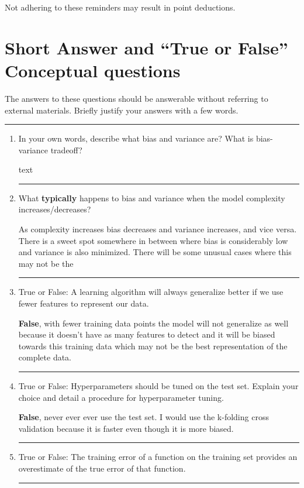 \documentclass{article}
\begin{document}
Not adhering to these reminders may result in point deductions. \\

\clearpage{}



\section*{Short Answer and ``True or False'' Conceptual questions}
\begin{aprob}
    The answers to these questions should be answerable without referring to external materials.  Briefly justify your answers with a few words.
    
    \rule{\textwidth}{0.25pt}
    \begin{enumerate}
        \item{} In your own words, describe what bias and variance are? What is bias-variance tradeoff?
        
        text

        \rule{\textwidth}{0.25pt}
        \newpage
        \item {} What \textbf{typically} happens to bias and variance when the model complexity increases/decreases?

        As complexity increases bias decreases and variance increases, and vice versa. There is a sweet spot somewhere in between where bias is considerably low and variance is also minimized. There will be some unusual cases where this may not be the

        \rule{\textwidth}{0.25pt}
        \newpage
        \item {} True or False: A learning algorithm will always generalize better if we use fewer features to represent our data.

        \textbf{False}, with fewer training data points the model will not generalize as well because it doesn't have as many features to detect and it will be biased towards this training data which may not be the best representation of the complete data.

        \rule{\textwidth}{0.25pt}
        \newpage
        \item {} True or False: Hyperparameters should be tuned on the test set. Explain your choice and detail a procedure for hyperparameter tuning.

        \textbf{False}, never ever ever use the test set. I would use the k-folding cross validation because it is faster even though it is more biased. 

        \rule{\textwidth}{0.25pt}
        \newpage
        \item {} True or False: The training error of a function on the training set provides an overestimate of the true error of that function.

        \rule{\textwidth}{0.25pt}
        \newpage
    \end{enumerate}

\end{aprob}
\end{document}
